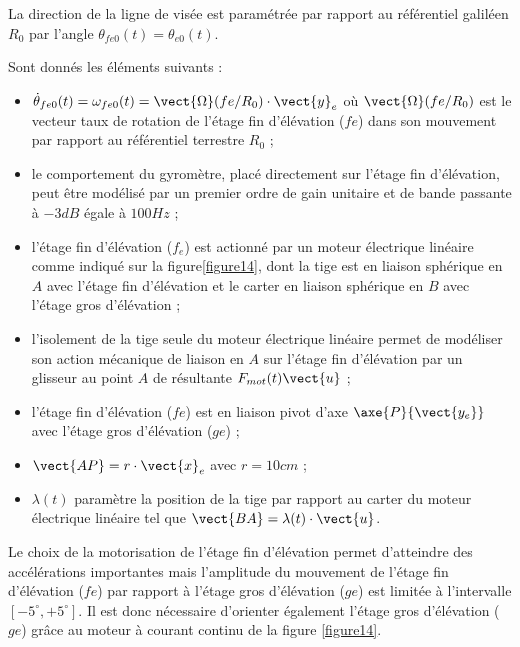 La direction de la ligne de visée est paramétrée par rapport au référentiel galiléen $R_0$ par l'angle $\theta_{fe0}(t)=\theta_{e0}(t)$.

Sont donnés les éléments suivants :
\begin{itemize}
\item $\dot{\theta}_{fe0}(t)=\omega_{fe0}(t)=\vect{\Omega}(fe/R_0)\cdot \vect{y}_e$ où $\vect{\Omega}(fe/R_0)$ est le vecteur taux de rotation de l'étage fin d'élévation ($fe$) dans
son mouvement par rapport au référentiel terrestre $R_0$ ;
\item le comportement du gyromètre, placé directement sur l'étage fin d'élévation, peut être modélisé par un
premier ordre de gain unitaire et de bande passante à $-3 dB$ égale à $100 Hz$ ;
\item l'étage fin d'élévation ($f_e$) est actionné par un moteur électrique linéaire comme indiqué sur la figure\ref{figure14},
dont la tige est en liaison sphérique en $A$ avec l'étage fin d'élévation et le carter en liaison sphérique en $B$ avec l'étage gros d'élévation ;
\item l'isolement de la tige seule du moteur électrique linéaire permet de modéliser son action mécanique de liaison
en $A$ sur l'étage fin d'élévation par un glisseur au point $A$ de résultante $F_{mot}(t)\vect{u}$ ;
\item l'étage fin d'élévation ($fe$) est en liaison pivot d'axe $\axe{P}{\vect{y_e}}$ avec l'étage gros d'élévation ($ge$) ;
\item $\vect{AP}=r\cdot \vect{x}_e$ avec $r=10cm$ ;
\item $\lambda(t)$ paramètre la position de la tige par rapport au carter du moteur électrique linéaire tel que $\vect{BA}=\lambda(t)\cdot \vect{u}$.
\end{itemize}

Le choix de la motorisation de l'étage fin d'élévation permet d'atteindre des accélérations importantes mais
l'amplitude du mouvement de l'étage fin d'élévation ($fe$) par rapport à l'étage gros d'élévation ($ge$) est limitée
à l'intervalle $\left[-5^{\circ}, +5^{\circ}\right]$. Il est donc nécessaire d'orienter également l'étage gros d'élévation ($ge$) grâce au moteur à courant continu de la figure \ref{figure14}.

